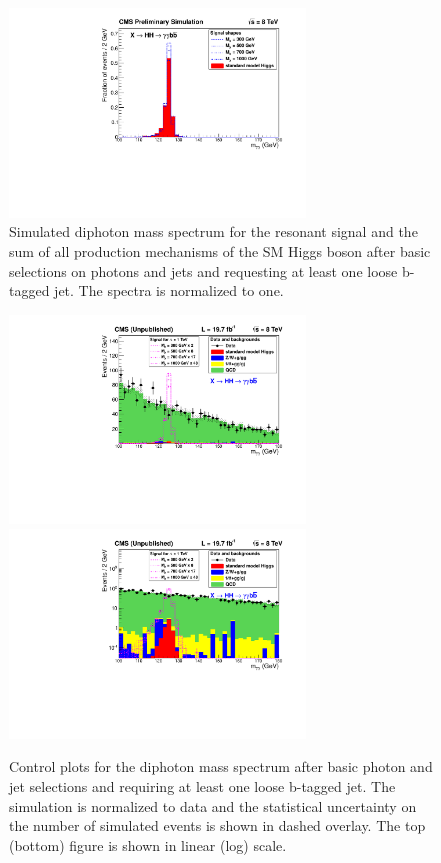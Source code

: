 \begin{figure}[ht]
 \begin{center}
   \includegraphics[width=0.70\textwidth]{figures/objects/DiPhotonMass_OnlyHiggs.pdf}
 \end{center}
\caption{Simulated diphoton mass spectrum for the resonant signal and the sum of all production
mechanisms of the
SM Higgs boson after basic selections on photons and jets and requesting at least
one loose b-tagged jet.
The spectra is normalized to one.}
\label{fig:mgg_onlyhiggs}
\end{figure}

\begin{figure}[ht]
 \begin{center}
   \includegraphics[width=0.70\textwidth]{figures/objects/DiPhotonMass_ShapeNormalized_sys.pdf}
   \includegraphics[width=0.70\textwidth]{figures/objects/DiPhotonMass_ShapeNormalized_Log_sys.pdf}
 \end{center}
\caption{Control plots for the diphoton mass spectrum after basic photon and jet selections
and requiring at least one loose b-tagged jet. The simulation is normalized to data and
the statistical uncertainty on the number of simulated events is shown in dashed overlay.
The top (bottom) figure is shown in linear (log) scale.}
\label{fig:mgg_controlplot}
\end{figure}


